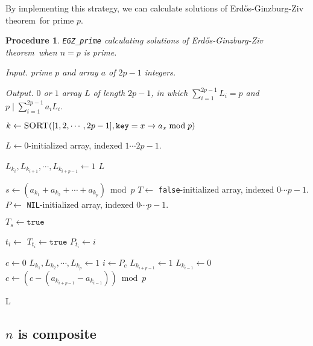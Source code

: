 \documentclass[11pt]{article}
\newtheorem{procedure}{Procedure}
\newcommand{\EGZT}{Erd\H{o}s-Ginzburg-Ziv theorem}
\begin{document}
By implementing this strategy, we can calculate solutions of \EGZT\ for prime $p$.


\begin{procedure} \texttt{EGZ\_prime} calculating solutions of \EGZT\ when $n=p$ is prime.

Input. prime $p$ and array $a$ of $2p-1$ integers.

Output. $0$ or $1$ array $L$ of length $2p-1$, in which $\sum_{i=1}^{2p-1} {L}_{i} = p$ and $p \mid \sum_{i=1}^{2p-1} {a}_{i}{L}_{i}$.

\end{procedure}

\begin{algorithmic}[1]


    \State $k \gets \Call{SORT}{[1, 2, \cdots, 2p-1], \texttt{key} = x \rightarrow a_x \bmod p}$
    
    \State $L \gets 0$-initialized array, indexed $1 \cdots {2p-1}$.
    
            \State $L_{k_{i}}, L_{k_{i+1}}, \cdots,  L_{k_{i+p-1}} \gets 1$
            \State \Return $L$
        \EndIf
    \EndFor
    
    \State $s \gets (a_{k_1} + a_{k_2}+ \cdots + a_{k_p}) \bmod p$
    \State $T \gets$ \texttt{false}-initialized array, indexed $0 \cdots {p-1}$.
    \State $P \gets$ \texttt{NIL}-initialized array, indexed $0 \cdots {p-1}$.
    
    \State $T_s \gets \texttt{true}$
    
    
        \State $t_i \gets$ 
        \State $T_{t_i} \gets \texttt{true}$
        \State $P_{t_i} \gets i$
    \EndWhile
    
    \State $c \gets 0$
    \State $L_{k_{1}}, L_{k_{2}}, \cdots,  L_{k_{p}} \gets 1$ 
        \State ${i} \gets {P_c}$
        \State $L_{k_{i+p-1}} \gets 1$
        \State $L_{k_{i-1}} \gets 0$
        \State $c \gets (c - (a_{k_{i+p-1}}-a_{k_{i-1}})) \bmod p $
    \EndWhile
    
    \State \Return L

\EndFunction


\end{algorithmic}

\subsection{$n$ is composite}
\end{document}
